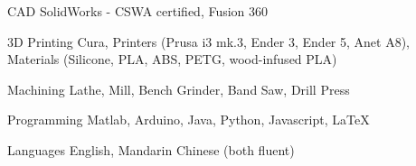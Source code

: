 


\begin{cvskills}


\cvskill
{CAD} %
{SolidWorks - CSWA certified, Fusion 360} %


\cvskill
{3D Printing} %
{Cura, Printers (Prusa i3 mk.3, Ender 3, Ender 5, Anet A8), Materials (Silicone, PLA, ABS, PETG, wood-infused PLA)} %

\cvskill
{Machining}
{Lathe, Mill, Bench Grinder, Band Saw, Drill Press}

\cvskill
{Programming} %
{Matlab, Arduino, Java, Python, Javascript, LaTeX} %

\cvskill
{Languages}
{English, Mandarin Chinese (both fluent)}


\end{cvskills}